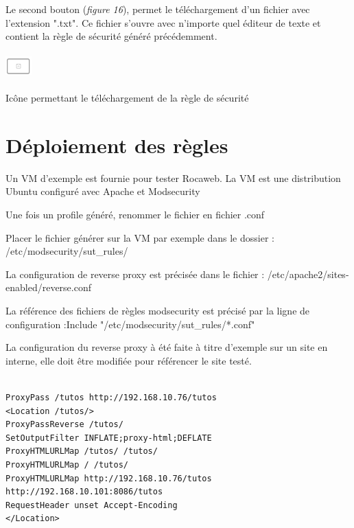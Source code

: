 \documentclass[a4paper,10pt,justified,openany]{tufte-book}
\begin{document}
 
Le second bouton ({\itshape figure 16}), permet le téléchargement d'un fichier avec l'extension ".txt". Ce fichier s'ouvre avec n'importe quel éditeur de texte et contient la règle de sécurité généré précédemment.  

\begin{marginfigure}
\includegraphics[width=1cm, height=1cm]{./images/visudownjobs.png}
\label{iconevueapprentissage}
\caption{Icône permettant le téléchargement de la règle de sécurité}
\end{marginfigure}

\section{Déploiement des règles}
Un VM d'exemple est fournie pour tester Rocaweb.
La VM est une distribution Ubuntu configuré avec Apache et Modsecurity

Une fois un profile généré, renommer le fichier en fichier .conf

Placer le fichier générer sur la VM par exemple dans le dossier : /etc/modsecurity/sut\_rules/

La configuration de reverse proxy est précisée dans le fichier : /etc/apache2/sites-enabled/reverse.conf

La référence des fichiers de règles modsecurity est précisé par la ligne de configuration :Include "/etc/modsecurity/sut\_rules/*.conf"

La configuration du reverse proxy à été faite à titre d'exemple sur un site en interne, elle doit être modifiée pour référencer le site testé.

\begin{verbatim}

ProxyPass /tutos http://192.168.10.76/tutos
<Location /tutos/>
ProxyPassReverse /tutos/
SetOutputFilter INFLATE;proxy-html;DEFLATE
ProxyHTMLURLMap /tutos/ /tutos/
ProxyHTMLURLMap / /tutos/
ProxyHTMLURLMap http://192.168.10.76/tutos http://192.168.10.101:8086/tutos
RequestHeader unset Accept-Encoding
</Location>

\end{verbatim}


\end{document}
